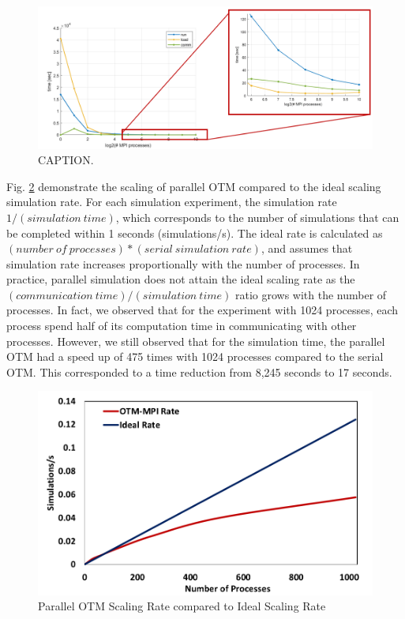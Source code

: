 \begin{figure}[h!]
    \centering
    \includegraphics[width=\columnwidth]{figs/mpirun.png}
    \caption{CAPTION.}
    \label{fig:mpirun}
\end{figure}
Fig. \ref{fig:scaling} demonstrate the scaling of parallel OTM compared to the ideal scaling simulation rate. For each simulation experiment, the simulation rate $1/(simulation \:time)$, which corresponds to the number of simulations that can be completed within 1 seconds (simulations/s). The ideal rate is calculated as $(number\: of\: processes)*(serial\: simulation\: rate)$, and assumes that simulation rate increases proportionally with the number of processes. In practice, parallel simulation does not attain the ideal scaling rate as the $(communication\:time)/(simulation\:time)$ ratio grows with the number of processes. In fact, we observed that for the experiment with 1024 processes, each process spend half of its computation time in communicating with other processes. However, we still observed that for the simulation time, the parallel OTM had a speed up of 475 times with 1024 processes compared to the serial OTM. This corresponded to a time reduction from 8,245 seconds to 17 seconds.

\begin{figure}[h!]
    \centering
    \includegraphics[width=\columnwidth]{figs/Scaling.png}
    \caption{Parallel OTM Scaling Rate compared to Ideal Scaling Rate}
    \label{fig:scaling}
\end{figure}

